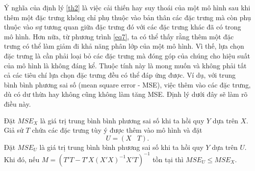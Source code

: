Ý nghĩa của định lý \ref{th2} là việc cải thiến hay suy thoái của một mô hình sau khi thêm một đặc trưng không chỉ phụ thuộc vào bản thân các đặc trưng mà còn phụ thuộc vào sự tương quan giữa đặc trưng đó với các đặc trưng khác đã có trong mô hình. Hơn nữa, từ phương trình \ref{eq7}, ta có thể thấy rằng thêm một đặc trưng có thể làm giảm đi khả năng phân lớp của một mô hình. Vì thế, lựa chọn đặc trưng là cần phải loại bỏ các đặc trưng mà đóng góp của chúng cho hiệu suất của mô hình là không đáng kể. Thuộc tính này là mong muốn và không phải tất cả các tiêu chí lựa chọn đặc trưng đều có thể đáp ứng được. Ví dụ, với trung bình bình phương sai số (mean square error - MSE), việc thêm vào các đặc trưng, dù có dư thừa hay không cũng không làm tăng MSE. Định lý dưới đây sẽ làm rõ điều này.

\begin{DL} \label{th3}
	Đặt $MSE_X$ là giá trị trung bình bình phương sai số khi ta hồi quy $Y$ dựa trên $X$. Giả sử $T$ chứa các đặc trưng tùy ý được thêm vào mô hình và đặt
	\begin{equation}
		U = (X\;\;\;T).
	\end{equation}
	Đặt $MSE_U$ là giá trị trung bình bình phương sai số khi ta hồi quy $Y$ dựa trên $U$. Khi đó, nếu $M = (T'T - T'X(X'X)^{-1}X'T)^{-1}$ tồn tại thì $MSE_U \le MSE_X$.
\end{DL}

